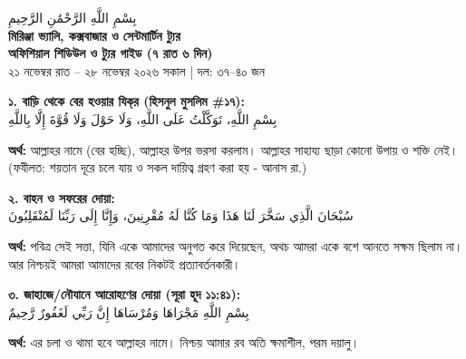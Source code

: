 \documentclass[11pt]{article}
\begin{document}
\begin{center}
    {\Large \color{islamicgreen} \textarabic{بِسْمِ اللَّهِ الرَّحْمَٰنِ الرَّحِيمِ}}\\[1.8mm]
    {\Large \textbf{\color{primary} মিরিঞ্জা ভ্যালি, কক্সবাজার ও সেন্টমার্টিন ট্যুর}}\\[0.8mm]
    {\normalsize \textbf{অফিশিয়াল শিডিউল ও ট্যুর গাইড (৭ রাত ৬ দিন)}}\\[0.6mm]
    {\scriptsize \color{gray} ২১ নভেম্বর রাত -- ২৮ নভেম্বর ২০২৬ সকাল \quad | \quad দল: ৩৭--৪০ জন}
\end{center}

\vspace{-0.5mm}

\begin{tcolorbox}[colframe=islamicgreen, colback=white, coltitle=white, title=\textbf{সফরের দোয়াসমূহ ও হাদিস (হিসনুল মুসলিম)}]
\begin{center}
\small\textbf{১. বাড়ি থেকে বের হওয়ার যিক্‌র (হিসনুল মুসলিম \#১৭):}\\[1mm]
{\large \color{islamicgreen} \textarabic{بِسْمِ اللَّهِ، تَوَكَّلْتُ عَلَى اللَّهِ، وَلَا حَوْلَ وَلَا قُوَّةَ إِلَّا بِاللَّهِ}}
\end{center}
\scriptsize
\textbf{অর্থ:} আল্লাহর নামে (বের হচ্ছি), আল্লাহর উপর ভরসা করলাম। আল্লাহর সাহায্য ছাড়া কোনো উপায় ও শক্তি নেই। (ফযীলত: শয়তান দূরে চলে যায় ও সকল দায়িত্ব গ্রহণ করা হয় - আনাস রা.)\\[1.2mm]

\begin{center}
\small\textbf{২. বাহন ও সফরের দোয়া:}\\[1mm]
{\large \color{islamicgreen} \textarabic{سُبْحَانَ الَّذِي سَخَّرَ لَنَا هَذَا وَمَا كُنَّا لَهُ مُقْرِنِينَ، وَإِنَّا إِلَى رَبِّنَا لَمُنْقَلِبُونَ}}
\end{center}
\scriptsize
\textbf{অর্থ:} পবিত্র সেই সত্তা, যিনি একে আমাদের অনুগত করে দিয়েছেন, অথচ আমরা একে বশে আনতে সক্ষম ছিলাম না। আর নিশ্চয়ই আমরা আমাদের রবের নিকটই প্রত্যাবর্তনকারী।\\[1.2mm]

\begin{center}
\small\textbf{৩. জাহাজে/নৌযানে আরোহণের দোয়া (সূরা হূদ ১১:৪১):}\\[1mm]
{\large \color{islamicgreen} \textarabic{بِسْمِ اللَّهِ مَجْرَاهَا وَمُرْسَاهَا إِنَّ رَبِّي لَغَفُورٌ رَّحِيمٌ}}
\end{center}
\scriptsize
\textbf{অর্থ:} এর চলা ও থামা হবে আল্লাহর নামে। নিশ্চয় আমার রব অতি ক্ষমাশীল, পরম দয়ালু।\\[1.2mm]


\end{tcolorbox}
\end{document}
